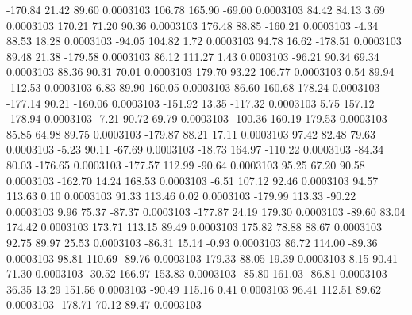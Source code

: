      -170.84       21.42       89.60     0.0003103
      106.78      165.90      -69.00     0.0003103
       84.42       84.13        3.69     0.0003103
      170.21       71.20       90.36     0.0003103
      176.48       88.85     -160.21     0.0003103
       -4.34       88.53       18.28     0.0003103
      -94.05      104.82        1.72     0.0003103
       94.78       16.62     -178.51     0.0003103
       89.48       21.38     -179.58     0.0003103
       86.12      111.27        1.43     0.0003103
      -96.21       90.34       69.34     0.0003103
       88.36       90.31       70.01     0.0003103
      179.70       93.22      106.77     0.0003103
        0.54       89.94     -112.53     0.0003103
        6.83       89.90      160.05     0.0003103
       86.60      160.68      178.24     0.0003103
     -177.14       90.21     -160.06     0.0003103
     -151.92       13.35     -117.32     0.0003103
        5.75      157.12     -178.94     0.0003103
       -7.21       90.72       69.79     0.0003103
     -100.36      160.19      179.53     0.0003103
       85.85       64.98       89.75     0.0003103
     -179.87       88.21       17.11     0.0003103
       97.42       82.48       79.63     0.0003103
       -5.23       90.11      -67.69     0.0003103
      -18.73      164.97     -110.22     0.0003103
      -84.34       80.03     -176.65     0.0003103
     -177.57      112.99      -90.64     0.0003103
       95.25       67.20       90.58     0.0003103
     -162.70       14.24      168.53     0.0003103
       -6.51      107.12       92.46     0.0003103
       94.57      113.63        0.10     0.0003103
       91.33      113.46        0.02     0.0003103
     -179.99      113.33      -90.22     0.0003103
        9.96       75.37      -87.37     0.0003103
     -177.87       24.19      179.30     0.0003103
      -89.60       83.04      174.42     0.0003103
      173.71      113.15       89.49     0.0003103
      175.82       78.88       88.67     0.0003103
       92.75       89.97       25.53     0.0003103
      -86.31       15.14       -0.93     0.0003103
       86.72      114.00      -89.36     0.0003103
       98.81      110.69      -89.76     0.0003103
      179.33       88.05       19.39     0.0003103
        8.15       90.41       71.30     0.0003103
      -30.52      166.97      153.83     0.0003103
      -85.80      161.03      -86.81     0.0003103
       36.35       13.29      151.56     0.0003103
      -90.49      115.16        0.41     0.0003103
       96.41      112.51       89.62     0.0003103
     -178.71       70.12       89.47     0.0003103
